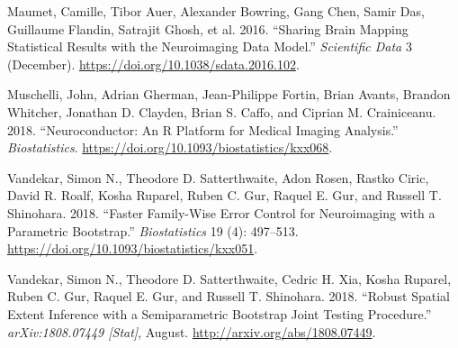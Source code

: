 \documentclass[]{article}
\begin{document}
\leavevmode\hypertarget{ref-maumet_sharing_2016}{}%
Maumet, Camille, Tibor Auer, Alexander Bowring, Gang Chen, Samir Das,
Guillaume Flandin, Satrajit Ghosh, et al. 2016. ``Sharing Brain Mapping
Statistical Results with the Neuroimaging Data Model.'' \emph{Scientific
Data} 3 (December). \url{https://doi.org/10.1038/sdata.2016.102}.

\leavevmode\hypertarget{ref-muschelli_neuroconductor:_2018}{}%
Muschelli, John, Adrian Gherman, Jean-Philippe Fortin, Brian Avants,
Brandon Whitcher, Jonathan D. Clayden, Brian S. Caffo, and Ciprian M.
Crainiceanu. 2018. ``Neuroconductor: An R Platform for Medical Imaging
Analysis.'' \emph{Biostatistics}.
\url{https://doi.org/10.1093/biostatistics/kxx068}.

\leavevmode\hypertarget{ref-vandekar_faster_2018}{}%
Vandekar, Simon N., Theodore D. Satterthwaite, Adon Rosen, Rastko Ciric,
David R. Roalf, Kosha Ruparel, Ruben C. Gur, Raquel E. Gur, and Russell
T. Shinohara. 2018. ``Faster Family-Wise Error Control for Neuroimaging
with a Parametric Bootstrap.'' \emph{Biostatistics} 19 (4): 497--513.
\url{https://doi.org/10.1093/biostatistics/kxx051}.

\leavevmode\hypertarget{ref-vandekar_robust_2018}{}%
Vandekar, Simon N., Theodore D. Satterthwaite, Cedric H. Xia, Kosha
Ruparel, Ruben C. Gur, Raquel E. Gur, and Russell T. Shinohara. 2018.
``Robust Spatial Extent Inference with a Semiparametric Bootstrap Joint
Testing Procedure.'' \emph{arXiv:1808.07449 {[}Stat{]}}, August.
\url{http://arxiv.org/abs/1808.07449}.
\end{document}
